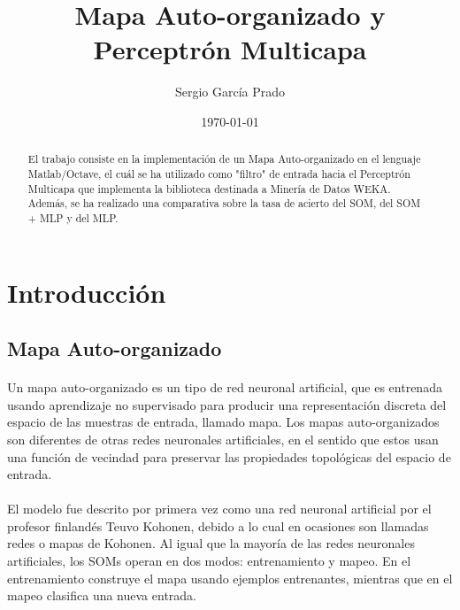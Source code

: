 \documentclass[10pt, a4paper,spanish]{article}
\title{\vspace{-15mm}\fontsize{24pt}{10pt}\selectfont\textbf{Mapa Auto-organizado y \\ Perceptrón Multicapa}} %
\author{Sergio García Prado}
\date{\today}
\begin{document}
	\maketitle %

	\thispagestyle{fancy} %


	\begin{abstract}
		\noindent El trabajo consiste en la implementación de un Mapa Auto-organizado en el lenguaje Matlab/Octave, el cuál se ha utilizado como "filtro" de entrada hacia el Perceptrón Multicapa que implementa la biblioteca destinada a Minería de Datos WEKA. Además, se ha realizado una comparativa sobre la tasa de acierto del SOM, del SOM + MLP y del MLP.
	\end{abstract}


	\section{Introducción}

		\subsection{Mapa Auto-organizado}

			\paragraph{}
			Un mapa auto-organizado es un tipo de red neuronal artificial, que es entrenada usando aprendizaje no supervisado para producir una representación discreta del espacio de las muestras de entrada, llamado mapa. Los mapas auto-organizados son diferentes de otras redes neuronales artificiales, en el sentido que estos usan una función de vecindad para preservar las propiedades topológicas del espacio de entrada. \cite{wikipedia:som}

			\paragraph{}
			El modelo fue descrito por primera vez como una red neuronal artificial por el profesor finlandés Teuvo Kohonen, debido a lo cual en ocasiones son llamadas redes o mapas de Kohonen. Al igual que la mayoría de las redes neuronales artificiales, los SOMs operan en dos modos: entrenamiento y mapeo. En el entrenamiento construye el mapa usando ejemplos entrenantes, mientras que en el mapeo clasifica una nueva entrada. \cite{wikipedia:som}
\end{document}
